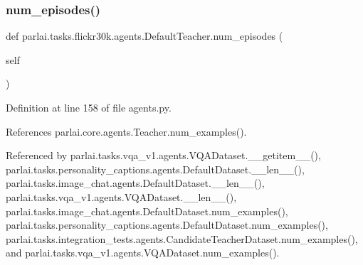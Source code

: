 \subsubsection{\texorpdfstring{num\+\_\+episodes()}{num\_episodes()}}
{\footnotesize\ttfamily def parlai.\+tasks.\+flickr30k.\+agents.\+Default\+Teacher.\+num\+\_\+episodes (\begin{DoxyParamCaption}\item[{}]{self }\end{DoxyParamCaption})}



Definition at line 158 of file agents.\+py.



References parlai.\+core.\+agents.\+Teacher.\+num\+\_\+examples().



Referenced by parlai.\+tasks.\+vqa\+\_\+v1.\+agents.\+V\+Q\+A\+Dataset.\+\_\+\+\_\+getitem\+\_\+\+\_\+(), parlai.\+tasks.\+personality\+\_\+captions.\+agents.\+Default\+Dataset.\+\_\+\+\_\+len\+\_\+\+\_\+(), parlai.\+tasks.\+image\+\_\+chat.\+agents.\+Default\+Dataset.\+\_\+\+\_\+len\+\_\+\+\_\+(), parlai.\+tasks.\+vqa\+\_\+v1.\+agents.\+V\+Q\+A\+Dataset.\+\_\+\+\_\+len\+\_\+\+\_\+(), parlai.\+tasks.\+image\+\_\+chat.\+agents.\+Default\+Dataset.\+num\+\_\+examples(), parlai.\+tasks.\+personality\+\_\+captions.\+agents.\+Default\+Dataset.\+num\+\_\+examples(), parlai.\+tasks.\+integration\+\_\+tests.\+agents.\+Candidate\+Teacher\+Dataset.\+num\+\_\+examples(), and parlai.\+tasks.\+vqa\+\_\+v1.\+agents.\+V\+Q\+A\+Dataset.\+num\+\_\+examples().

